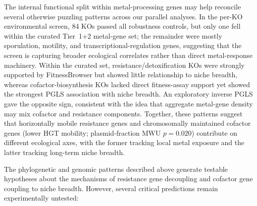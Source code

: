\documentclass[times]{zHenriquesLab-StyleBioRxiv}
\begin{document}
The internal functional split within metal-processing genes may help reconcile
several otherwise puzzling patterns across our parallel analyses. In the per-KO
environmental screen, 84 KOs passed all robustness controls, but only one fell
within the curated Tier~1+2 metal-gene set; the remainder were mostly sporulation,
motility, and transcriptional-regulation genes, suggesting that the screen is
capturing broader ecological correlates rather than direct metal-response
machinery. Within the curated set, resistance/detoxification KOs were strongly
supported by FitnessBrowser but showed little relationship to niche breadth,
whereas cofactor-biosynthesis KOs lacked direct fitness-assay support yet showed
the strongest PGLS association with niche breadth. An exploratory inverse PGLS
gave the opposite sign, consistent with the idea that aggregate metal-gene
density may mix cofactor and resistance components. Together, these patterns
suggest that horizontally mobile resistance genes and chromosomally maintained cofactor genes (lower HGT mobility; plasmid-fraction MWU $p = 0.020$) contribute on
different ecological axes, with the former tracking local metal exposure and the
latter tracking long-term niche breadth.



The phylogenetic and genomic patterns described above generate testable hypotheses
about the mechanisms of resistance gene decoupling and cofactor gene coupling to
niche breadth. However, several critical predictions remain experimentally untested:
\end{document}
